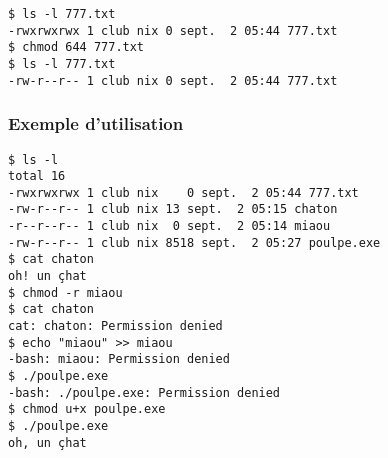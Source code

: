 \begin{lstlisting}
$ ls -l 777.txt
-rwxrwxrwx 1 club nix 0 sept.  2 05:44 777.txt
$ chmod 644 777.txt
$ ls -l 777.txt
-rw-r--r-- 1 club nix 0 sept.  2 05:44 777.txt
\end{lstlisting}

\subsubsection*{Exemple d'utilisation}
\begin{lstlisting}
$ ls -l
total 16
-rwxrwxrwx 1 club nix    0 sept.  2 05:44 777.txt
-rw-r--r-- 1 club nix 13 sept.  2 05:15 chaton
-r--r--r-- 1 club nix  0 sept.  2 05:14 miaou
-rw-r--r-- 1 club nix 8518 sept.  2 05:27 poulpe.exe
$ cat chaton
oh! un çhat
$ chmod -r miaou
$ cat chaton
cat: chaton: Permission denied
$ echo "miaou" >> miaou 
-bash: miaou: Permission denied
$ ./poulpe.exe 
-bash: ./poulpe.exe: Permission denied
$ chmod u+x poulpe.exe
$ ./poulpe.exe
oh, un çhat
\end{lstlisting}
